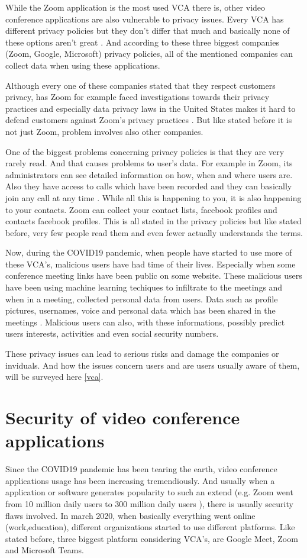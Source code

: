 \documentclass[utf8,english]{gradu3}
\begin{document}
While the Zoom application is the most used VCA there is, other video conference applications are also vulnerable to privacy issues. Every VCA has different privacy policies but they don't differ that much and basically none of these options aren't great \parencite{ZoomGoogleMS}. And according to these three biggest companies (Zoom, Google, Microsoft) privacy policies, all of the mentioned companies can collect data when using these applications. 

Although every one of these companies stated that they respect customers privacy, has Zoom for example faced investigations towards their privacy practices and especially data privacy laws in the United States makes it hard to defend customers against Zoom's privacy practices \parencite{Darkside}. But like stated before it is not just Zoom, problem involves also other companies.

One of the biggest problems concerning privacy policies is that they are very rarely read. And that causes problems to user's data. For example in Zoom, its administrators can see detailed information on how, when and where users are. Also they have access to calls which have been recorded and they can basically join any call at any time \parencite{Darkside}.
%
While all this is happening to you, it is also happening to your contacts. Zoom can collect your contact lists, facebook profiles and contacts facebook profiles. This is all stated in the privacy policies but like stated before, very few people read them and even fewer actually understands the terms.

Now, during the COVID19 pandemic, when people have started to use more of these VCA's, malicious users have had time of their lives. Especially when some conference meeting links have been public on some website. These malicious users have been using machine learning techiques to infiltrate to the meetings and when in a meeting, collected personal data from users. Data such as profile pictures, usernames, voice and personal data which has been shared in the meetings \parencite{zoomingInto}.
Malicious users can also, with these informations, possibly predict users interests, activities and even social security numbers.

These privacy issues can lead to serious risks and damage the companies or inviduals. And how the issues concern users and are users usually aware of them, will be surveyed here \ref{vca}.

\section{Security of video conference applications}
Since the COVID19 pandemic has been tearing the earth, video conference applications usage has been increasing tremendiously. And usually when a application or software generates popularity to such an extend (e.g. Zoom went from 10 million daily users to 300 million daily users \parencite{goneWrongZoom}), there is usually security flaws involved. 
In march 2020, when basically everything went online (work,education), different organizations started to use different platforms. Like stated before, three biggest platform considering VCA's, are Google Meet, Zoom and Microsoft Teams.
\end{document}
